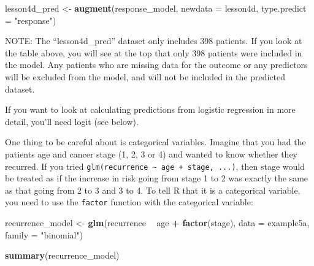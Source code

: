 \documentclass[]{book}
\newenvironment{Shaded}{\begin{snugshade}}{\end{snugshade}}
\newcommand{\DataTypeTok}[1]{\textcolor[rgb]{0.13,0.29,0.53}{#1}}
\newcommand{\KeywordTok}[1]{\textcolor[rgb]{0.13,0.29,0.53}{\textbf{#1}}}
\newcommand{\NormalTok}[1]{#1}
\newcommand{\OperatorTok}[1]{\textcolor[rgb]{0.81,0.36,0.00}{\textbf{#1}}}
\newcommand{\OtherTok}[1]{\textcolor[rgb]{0.56,0.35,0.01}{#1}}
\newcommand{\StringTok}[1]{\textcolor[rgb]{0.31,0.60,0.02}{#1}}
\begin{document}
\begin{Shaded}
\begin{Highlighting}[]
\NormalTok{lesson4d_pred <-}
\StringTok{  }\KeywordTok{augment}\NormalTok{(response_model,}
          \DataTypeTok{newdata =}\NormalTok{ lesson4d,}
          \DataTypeTok{type.predict =} \StringTok{"response"}\NormalTok{)}
\end{Highlighting}
\end{Shaded}

NOTE: The ``lesson4d\_pred'' dataset only includes 398 patients. If you
look at the table above, you will see at the top that only 398 patients
were included in the model. Any patients who are missing data for the
outcome or any predictors will be excluded from the model, and will not
be included in the predicted dataset.

If you want to look at calculating predictions from logistic regression
in more detail, you'll need logit (see below).

One thing to be careful about is categorical variables. Imagine that you
had the patients age and cancer stage (1, 2, 3 or 4) and wanted to know
whether they recurred. If you tried
\texttt{glm(recurrence\ \textasciitilde{}\ age\ +\ stage,\ ...)}, then
stage would be treated as if the increase in risk going from stage 1 to
2 was exactly the same as that going from 2 to 3 and 3 to 4. To tell R
that it is a categorical variable, you need to use the \texttt{factor}
function with the categorical variable:

\begin{Shaded}
\begin{Highlighting}[]
\NormalTok{recurrence_model <-}
\StringTok{  }\KeywordTok{glm}\NormalTok{(recurrence }\OperatorTok{~}\StringTok{ }\NormalTok{age }\OperatorTok{+}\StringTok{ }\KeywordTok{factor}\NormalTok{(stage), }\DataTypeTok{data =}\NormalTok{ example5a, }\DataTypeTok{family =} \StringTok{"binomial"}\NormalTok{)}

\KeywordTok{summary}\NormalTok{(recurrence_model)}
\end{Highlighting}
\end{Shaded}

\begin{Shaded}
\end{Shaded}
\end{document}
